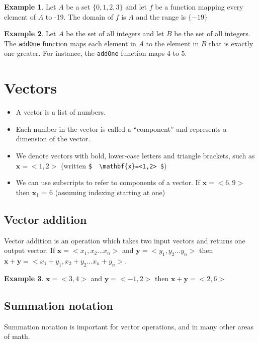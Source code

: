 \documentclass[]{article}
\theoremstyle{definition}
\newtheorem{exmp}{Example}[section]
\begin{document}
\begin{exmp}
Let $A$ be a set $\{0,1,2,3\}$ and let $f$ be a function mapping every element of $A$ to -19. The domain of $f$ is $A$ and the range is $\{-19\}$
\end{exmp}

\begin{exmp}
Let $A$ be the set of all integers and let $B$ be the set of all integers. The \texttt{addOne} function maps each element in $A$ to the element in $B$ that is exactly one greater. For instance, the \texttt{addOne} function maps 4 to 5.
\end{exmp}

\section{Vectors}

\begin{itemize}
\item A vector is a list of numbers. 
\item Each number in the vector is called a ``component'' and represents a dimension of the vector. 
\item We denote vectors with bold, lower-case letters and triangle brackets, such as $ \mathbf{x}=<1,2> $ (written \verb|$  \mathbf{x}=<1,2> $|)
\item We can use subscripts to refer to components of a vector. If $\mathbf{x}=<6,9>$ then $\mathbf{x}_1$ = 6 (assuming indexing starting at one)
\end{itemize}

\subsection{Vector addition}

Vector addition is an operation which takes two input vectors and returns one output vector. If  $\mathbf{x}=<x_1, x_2 ... x_n>$ and $\mathbf{y}=<y_1, y_2 ... y_n>$  then  $\mathbf{x}+\mathbf{y}=<x_1 + y_1, x_2 + y_2 ... x_n + y_n>$.

\begin{exmp}
$\mathbf{x}=<3,4>$ and $\mathbf{y}=<-1,2>$  then  $\mathbf{x}+\mathbf{y}=<2,6>$
\end{exmp}

\subsection{Summation notation}

Summation notation is important for vector operations, and in many other areas of math. 
\end{document}
